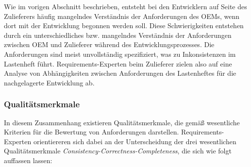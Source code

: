 \documentclass[12pt]{report}
\begin{document}
Wie im vorigen Abschnitt beschrieben, entsteht bei den Entwicklern auf Seite des Zulieferers häufig mangelndes Verständnis der Anforderungen des OEMs, wenn dort mit der Entwicklung begonnen werden soll. Diese Schwierigkeiten entstehen durch ein unterschiedliches bzw. mangelndes Verständnis der Anforderungen zwischen OEM und Zulieferer während des Entwicklungsprozesses. Die Anforderungen sind meist unvollständig spezifiziert, was zu Inkonsistenzen im Lastenheft führt. Requirements-Experten beim Zulieferer zielen also auf eine Analyse von Abhängigkeiten zwischen Anforderungen des Lastenheftes für die nachgelagerte Entwicklung ab. 

\subsubsection{Qualitätsmerkmale}
In diesem Zusammenhang existieren Qualitätsmerkmale, die gemäß \cite{zg02} wesentliche Kriterien für die Bewertung von Anforderungen darstellen. Requirements-Experten orientiereren sich dabei an der Unterscheidung der drei wesentlichen Qualitätsmerkmale \textit{Consistency-Correctness-Completeness}, die sich wie folgt auffassen lassen:
\end{document}
